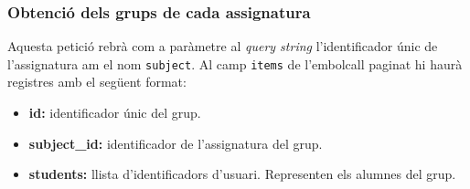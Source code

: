 \subsubsection{Obtenció dels grups de cada assignatura}

	Aquesta petició rebrà com a paràmetre al \emph{query string} l'identificador únic de l'assignatura am el nom \texttt{subject}. Al camp \texttt{items} de l'embolcall paginat hi haurà registres amb el següent format:
	
	\begin{itemize}
		\item \textbf{id:} identificador únic del grup.
		\item \textbf{subject\_id:} identificador de l'assignatura del grup.
		\item \textbf{students:} llista d'identificadors d'usuari. Representen els alumnes del grup.
	\end{itemize}
	

		